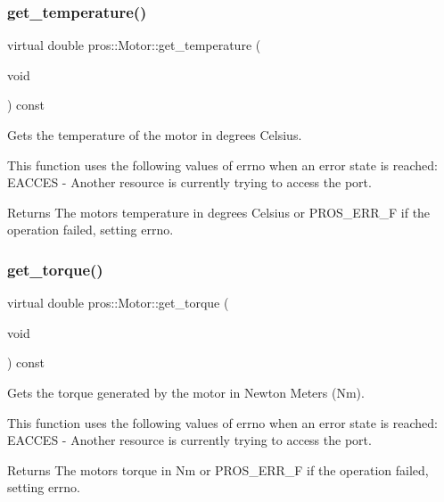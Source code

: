 \subsubsection{\texorpdfstring{get\_temperature()}{get\_temperature()}}
{\footnotesize\ttfamily virtual double pros\+::\+Motor\+::get\+\_\+temperature (\begin{DoxyParamCaption}\item[{void}]{ }\end{DoxyParamCaption}) const\hspace{0.3cm}{\ttfamily [virtual]}}



Gets the temperature of the motor in degrees Celsius. 

This function uses the following values of errno when an error state is reached\+: E\+A\+C\+C\+ES -\/ Another resource is currently trying to access the port.

\begin{DoxyReturn}{Returns}
The motor\textquotesingle{}s temperature in degrees Celsius or P\+R\+O\+S\+\_\+\+E\+R\+R\+\_\+F if the operation failed, setting errno. 
\end{DoxyReturn}
\mbox{\label{classpros_1_1Motor_a14e0c57c0ca7bde15f73414abf4c3c8e}} 
\subsubsection{\texorpdfstring{get\_torque()}{get\_torque()}}
{\footnotesize\ttfamily virtual double pros\+::\+Motor\+::get\+\_\+torque (\begin{DoxyParamCaption}\item[{void}]{ }\end{DoxyParamCaption}) const\hspace{0.3cm}{\ttfamily [virtual]}}



Gets the torque generated by the motor in Newton Meters (Nm). 

This function uses the following values of errno when an error state is reached\+: E\+A\+C\+C\+ES -\/ Another resource is currently trying to access the port.

\begin{DoxyReturn}{Returns}
The motor\textquotesingle{}s torque in Nm or P\+R\+O\+S\+\_\+\+E\+R\+R\+\_\+F if the operation failed, setting errno. 
\end{DoxyReturn}
\mbox{\label{classpros_1_1Motor_a2b939563c3b915d7b8ce3dd1dece6208}} 
